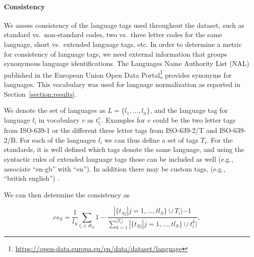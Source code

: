 
\paragraph{Consistency}

We assess consistency of the language tags used throughout the dataset, such as standard vs.\ non-standard codes, two vs.\ three letter codes for the same language, short vs.\ extended language tags, etc. In order to determine a metric for consistency of language tags, we need external information that groups synonymous language identifications. The Languages Name Authority List (NAL) published in the European Union Open Data Portal\footnote{\url{https://open-data.europa.eu/en/data/dataset/language}} provides synonyms for languages. This vocabulary was used for language normalization as reported in Section~\ref{section:results}.

We denote the set of languages as $L=\{l_1, \ldots, l_n\}$, and the language tag for language $l_i$ in vocabulary $v$ as $t_{l_i}^v$. Examples for $v$ could be the two letter tags from ISO-639-1 or the different three letter tags from ISO-639-2/T and ISO-639-2/B. For each of the languages $l_i$ we can thus define a set of tags $T_i$.
For the standards, it is well defined which tags denote the same language, and using the syntactic rules of extended language tags those can be included as well (e.g., associate ``en-gb'' with ``en''). In addition there may be custom tags, (e.g., ``british english'') .

We can then determine the consistency as

\begin{equation}
cs_S = \frac{1}{l_S} \sum_{l_i \in dl_S} 1 - \frac{|\{t_{Sj}| j=1, \ldots, tl_S \} \cup T_i| -1}{\sum_{k=1}^{|T_i|} |\{t_{Sj}| j=1, \ldots, tl_S \} \cup {t^k_i}| },
\end{equation}

